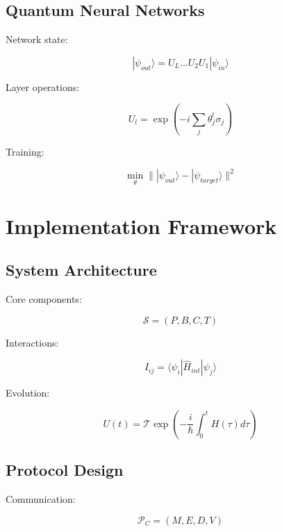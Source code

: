 \documentclass[12pt]{article}
\begin{document}
\subsection{Quantum Neural Networks}

Network state:

\begin{equation}
|\psi_{out}\rangle = U_L...U_2U_1|\psi_{in}\rangle
\end{equation}

Layer operations:

\begin{equation}
U_l = \exp(-i\sum_j \theta_j^l\sigma_j)
\end{equation}

Training:

\begin{equation}
\min_{\theta} \||\psi_{out}\rangle - |\psi_{target}\rangle\|^2
\end{equation}

\section{Implementation Framework}

\subsection{System Architecture}

Core components:

\begin{equation}
\mathcal{S} = (P,B,C,T)
\end{equation}

Interactions:

\begin{equation}
I_{ij} = \langle\psi_i|\hat{H}_{int}|\psi_j\rangle
\end{equation}

Evolution:

\begin{equation}
U(t) = \mathcal{T}\exp\left(-\frac{i}{\hbar}\int_0^t H(\tau)d\tau\right)
\end{equation}

\subsection{Protocol Design}

Communication:

\begin{equation}
\mathcal{P}_C = (M,E,D,V)
\end{equation}
\end{document}
